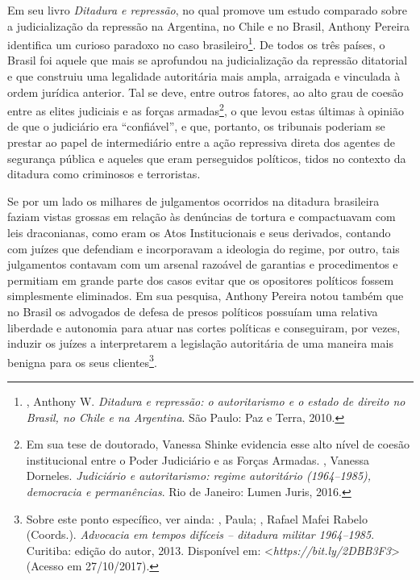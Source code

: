 Em seu livro \emph{Ditadura e repressão}, no qual promove um estudo
comparado sobre a judicialização da repressão na Argentina, no Chile e
no Brasil, Anthony Pereira identifica um curioso paradoxo no caso
brasileiro\footnote{, Anthony W. \emph{Ditadura e repressão: o
  autoritarismo e o estado de direito no Brasil, no Chile e na
  Argentina}. São Paulo: Paz e Terra, 2010.}. De todos os três países, o
Brasil foi aquele que mais se aprofundou na judicialização da repressão
ditatorial e que construiu uma legalidade autoritária mais ampla,
arraigada e vinculada à ordem jurídica anterior. Tal se deve, entre
outros fatores, ao alto grau de coesão entre as elites judiciais e as
forças armadas\footnote{Em sua tese de doutorado, Vanessa Shinke
  evidencia esse alto nível de coesão institucional entre o Poder
  Judiciário e as Forças Armadas. , Vanessa Dorneles.
  \emph{Judiciário e autoritarismo: regime autoritário (1964--1985),
  democracia e permanências}. Rio de Janeiro: Lumen Juris, 2016.}, o que
levou estas últimas à opinião de que o judiciário era ``confiável'', e
que, portanto, os tribunais poderiam se prestar ao papel de intermediário
entre a ação repressiva direta dos agentes de segurança pública e
aqueles que eram perseguidos políticos, tidos no contexto da ditadura
como criminosos e terroristas.

Se por um lado os milhares de julgamentos ocorridos na ditadura
brasileira faziam vistas grossas em relação às denúncias de tortura e
compactuavam com leis draconianas, como eram os Atos Institucionais e
seus derivados, contando com juízes que defendiam e incorporavam a
ideologia do regime, por outro, tais julgamentos contavam com um arsenal
razoável de garantias e procedimentos e permitiam em grande parte dos
casos evitar que os opositores políticos fossem simplesmente eliminados.
Em sua pesquisa, Anthony Pereira notou também que no Brasil os advogados
de defesa de presos políticos possuíam uma relativa liberdade e
autonomia para atuar nas cortes políticas e conseguiram, por vezes,
induzir os juízes a interpretarem a legislação autoritária de uma
maneira mais benigna para os seus clientes\footnote{Sobre este ponto
  específico, ver ainda: , Paula; , Rafael Mafei Rabelo
  (Coords.). \emph{Advocacia em tempos difíceis -- ditadura militar
  1964--1985}. Curitiba: edição do autor, 2013. Disponível em:
 \textless{}\emph{https://bit.ly/2DBB3F3}\textgreater{}
  (Acesso em 27/10/2017).}.

